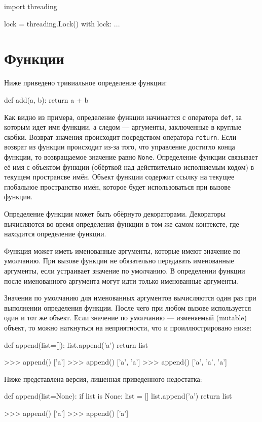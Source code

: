 \begin{pylst}{}{}
import threading

lock = threading.Lock()
with lock: ...
\end{pylst}

\section{Функции}
Ниже приведено тривиальное определение функции:
\begin{pylst}{}{}
def add(a, b):
    return a + b
\end{pylst}

Как видно из примера, определение функции начинается с оператора \lstinline{def}, за которым идет имя функции, а следом --- аргументы, заключенные в круглые скобки. Возврат значения происходит посредством оператора \lstinline{return}. Если возврат из функции происходит из-за того, что управление достигло конца функции, то возвращаемое значение равно \lstinline{None}. Определение функции связывает её имя с объектом функции (обёрткой над действительно исполняемым кодом) в текущем пространсве имён. Объект функции содержит ссылку на текущее глобальное пространство имён, которое будет использоваться при вызове функции.

Определение функции может быть обёрнуто декораторами. Декораторы вычисляются во время определения функции в том же самом контексте, где находится определение функции.

Функция может иметь именованные аргументы, которые имеют значение по умолчанию. При вызове функции не обязательно передавать именованные аргументы, если устраивает значение по умолчанию. В определении функции после именованного аргумента могут идти только именованные аргументы.

Значения по умолчанию для именованных аргументов вычисляются один раз при выполнении определения функции. После чего при любом вызове используется один и тот же объект. Если значение по умолчанию --- изменяемый (mutable) объект, то можно наткнуться на неприятности, что и проиллюстрировано ниже:
\begin{pylst}{}{}
def append(list=[]):
    list.append('a')
    return list

>>> append()
['a']
>>> append()
['a', 'a']
>>> append()
['a', 'a', 'a']
\end{pylst}

Ниже представлена версия, лишенная приведенного недостатка:
\begin{pylst}{}{}
def append(list=None):
    if list is None:
        list = []
    list.append('a')
    return list

>>> append()
['a']
>>> append()
['a']
\end{pylst}

